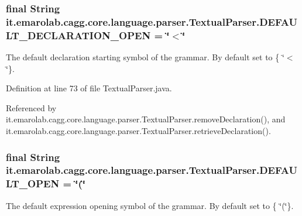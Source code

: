 \hypertarget{classit_1_1emarolab_1_1cagg_1_1core_1_1language_1_1parser_1_1TextualParser_aa075e6ceef45f7c212a5a7074e3c3417}{
\subsubsection[{D\-E\-F\-A\-U\-L\-T\-\_\-\-D\-E\-C\-L\-A\-R\-A\-T\-I\-O\-N\-\_\-\-O\-P\-E\-N}]{\setlength{\rightskip}{0pt plus 5cm}final String it.\-emarolab.\-cagg.\-core.\-language.\-parser.\-Textual\-Parser.\-D\-E\-F\-A\-U\-L\-T\-\_\-\-D\-E\-C\-L\-A\-R\-A\-T\-I\-O\-N\-\_\-\-O\-P\-E\-N = \char`\"{}$<$\char`\"{}\hspace{0.3cm}{\ttfamily [static]}}}\label{classit_1_1emarolab_1_1cagg_1_1core_1_1language_1_1parser_1_1TextualParser_aa075e6ceef45f7c212a5a7074e3c3417}
The default declaration starting symbol of the grammar. By default set to \{ \char`\"{}$<$\char`\"{}\}. 

Definition at line 73 of file Textual\-Parser.\-java.



Referenced by it.\-emarolab.\-cagg.\-core.\-language.\-parser.\-Textual\-Parser.\-remove\-Declaration(), and it.\-emarolab.\-cagg.\-core.\-language.\-parser.\-Textual\-Parser.\-retrieve\-Declaration().

\hypertarget{classit_1_1emarolab_1_1cagg_1_1core_1_1language_1_1parser_1_1TextualParser_a4b3f1d558ca20b275641ed2a5e6b21eb}{
\subsubsection[{D\-E\-F\-A\-U\-L\-T\-\_\-\-O\-P\-E\-N}]{\setlength{\rightskip}{0pt plus 5cm}final String it.\-emarolab.\-cagg.\-core.\-language.\-parser.\-Textual\-Parser.\-D\-E\-F\-A\-U\-L\-T\-\_\-\-O\-P\-E\-N = \char`\"{}(\char`\"{}\hspace{0.3cm}{\ttfamily [static]}}}\label{classit_1_1emarolab_1_1cagg_1_1core_1_1language_1_1parser_1_1TextualParser_a4b3f1d558ca20b275641ed2a5e6b21eb}
The default expression opening symbol of the grammar. By default set to \{ \char`\"{}(\char`\"{}\}. 

